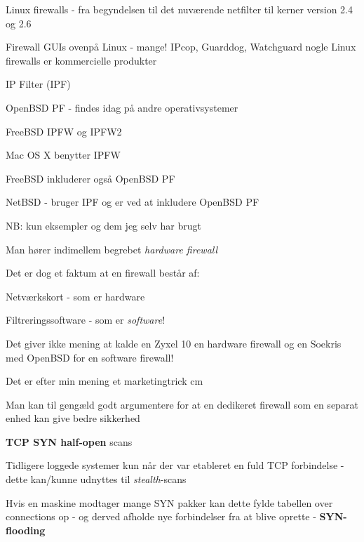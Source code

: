 \begin{list2} 
\item Linux firewalls - fra begyndelsen til det nuværende netfilter
  til kerner version 2.4 og 2.6\\
\item Firewall GUIs ovenpå Linux - mange! IPcop, Guarddog, Watchguard
nogle Linux firewalls er kommercielle produkter
\item IP Filter (IPF) 
\item OpenBSD PF - findes idag på andre operativsystemer
\item FreeBSD IPFW og IPFW2 
\item Mac OS X benytter IPFW
\item FreeBSD inkluderer også OpenBSD PF
\item NetBSD - bruger IPF og er ved at inkludere OpenBSD PF
\end{list2}

NB: kun eksempler og dem jeg selv har brugt




\begin{list1}
\item Man hører indimellem begrebet \emph{hardware firewall}  
\item Det er dog et faktum at en firewall består af:
\begin{list2}
\item Netværkskort - som er hardware
\item Filtreringssoftware - som er \emph{software}!    
\end{list2}
\item Det giver ikke mening at kalde en Zyxel 10 en hardware firewall
  og en Soekris med OpenBSD for en software firewall!
\item Det er efter min mening et marketingtrick
 cm
\item Man kan til gengæld godt argumentere for at en dedikeret
  firewall som en separat enhed kan give bedre sikkerhed
\end{list1}



\begin{list2}
\item {\bfseries TCP SYN half-open} scans
\item Tidligere loggede systemer kun når der var etableret en fuld TCP
  forbindelse - dette kan/kunne udnyttes til \emph{stealth}-scans
\item Hvis en maskine modtager mange SYN pakker kan dette fylde
  tabellen over connections op - og derved afholde nye forbindelser
  fra at blive oprette - {\bfseries SYN-flooding}
\end{list2}

